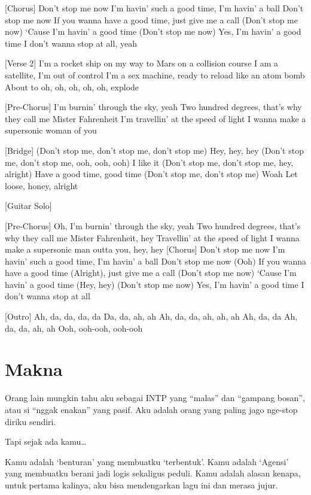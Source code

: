 \documentclass[
  letterpaper,
  DIV=11,
  numbers=noendperiod]{scrreprt}
\begin{document}
{[}Chorus{]} Don't stop me now I'm havin' such a good time, I'm havin' a
ball Don't stop me now If you wanna have a good time, just give me a
call (Don't stop me now) `Cause I'm havin' a good time (Don't stop me
now) Yes, I'm havin' a good time I don't wanna stop at all, yeah

{[}Verse 2{]} I'm a rocket ship on my way to Mars on a collision course
I am a satellite, I'm out of control I'm a sex machine, ready to reload
like an atom bomb About to oh, oh, oh, oh, oh, explode

{[}Pre-Chorus{]} I'm burnin' through the sky, yeah Two hundred degrees,
that's why they call me Mister Fahrenheit I'm travellin' at the speed of
light I wanna make a supersonic woman of you

{[}Bridge{]} (Don't stop me, don't stop me, don't stop me) Hey, hey, hey
(Don't stop me, don't stop me, ooh, ooh, ooh) I like it (Don't stop me,
don't stop me, hey, alright) Have a good time, good time (Don't stop me,
don't stop me) Woah Let loose, honey, alright

{[}Guitar Solo{]}

{[}Pre-Chorus{]} Oh, I'm burnin' through the sky, yeah Two hundred
degrees, that's why they call me Mister Fahrenheit, hey Travellin' at
the speed of light I wanna make a supersonic man outta you, hey, hey
{[}Chorus{]} Don't stop me now I'm havin' such a good time, I'm havin' a
ball Don't stop me now (Ooh) If you wanna have a good time (Alright),
just give me a call (Don't stop me now) `Cause I'm havin' a good time
(Hey, hey) (Don't stop me now) Yes, I'm havin' a good time I don't wanna
stop at all

{[}Outro{]} Ah, da, da, da, da Da, da, ah, ah Ah, da, da, ah, ah, ah Ah,
da, da Ah, da, da, ah, ah Ooh, ooh-ooh, ooh-ooh

\section{Makna}\label{makna}

Orang lain mungkin tahu aku sebagai INTP yang ``malas'' dan ``gampang
bosan'', atau si ``nggak enakan'' yang pasif. Aku adalah orang yang
paling jago nge-stop diriku sendiri.

Tapi sejak ada kamu\ldots{}

Kamu adalah `benturan' yang membuatku `terbentuk'. Kamu adalah `Agensi'
yang membuatku berani jadi logis sekaligus peduli. Kamu adalah alasan
kenapa, untuk pertama kalinya, aku bisa mendengarkan lagu ini dan merasa
jujur.
\end{document}
